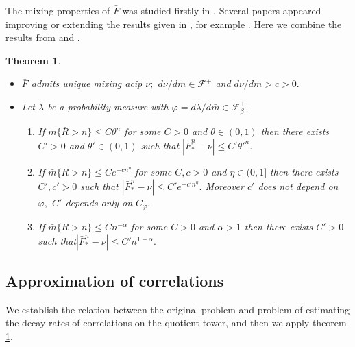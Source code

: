 \documentclass[a4paper,12pt]{amsart}
\numberwithin{equation}{section}
\newtheorem{theorem}{Theorem}[section]\newtheorem{lemma}[theorem]{Lemma}
\begin{document}
The mixing properties of  $\bar F$ was studied firstly in \cite{Y2}.
Several papers appeared improving or extending the results given in
\cite{Y2}, for example \cite{Gou, Hol, Ly}. Here we combine the
results from \cite{AlvPin} and \cite{Y2}.

\begin{theorem} \cite{AlvPin,Y2}\label{speed}
\begin{itemize}
\item[(i)] $\bar F$ admits unique mixing acip $\bar \nu;$
 $d\bar\nu/d\bar m\in\mathcal F^+$ and $d\bar\nu/d\bar m>c>0.$
 \item[(ii)] Let $\lambda$
be a probability  measure with $\varphi=d\lambda/d\bar m\in \mathcal
F^+_\beta.$
\begin{enumerate}
\item If $\bar m\{\bar R>n\}\le C\theta^n$ for some $C>0$ and
$\theta\in(0, 1)$ then there exists $C'>0$ and $\theta'\in(0, 1)$
such that $|\bar F_\ast^n-\nu|\le C'\theta'^n.$
\item If $\bar m\{\bar R>n\}\le Ce^{-cn^\eta}$ for some $C, c>0$ and
$\eta\in(0, 1]$ then there exists $C',c'>0$ such that $|\bar
F_\ast^n-\nu|\le C'e^{-c'n^\eta}.$ Moreover $c'$ does not depend on
$\varphi,$ $C'$ depends only on $C_\varphi.$
\item If $\bar
m\{\bar R>n\}\le Cn^{-\alpha}$ for some $C>0$ and $\alpha>1$ then
there exists $C'>0$ such that$ |\bar F_\ast^n-\nu|\le
C'n^{1-\alpha}.$
\end{enumerate}
\end{itemize}
\end{theorem}

\subsection{Approximation of correlations}
We establish the relation between the original problem and problem
of estimating the decay rates of correlations on the quotient tower,
and then we apply theorem \ref{speed}.
\end{document}
